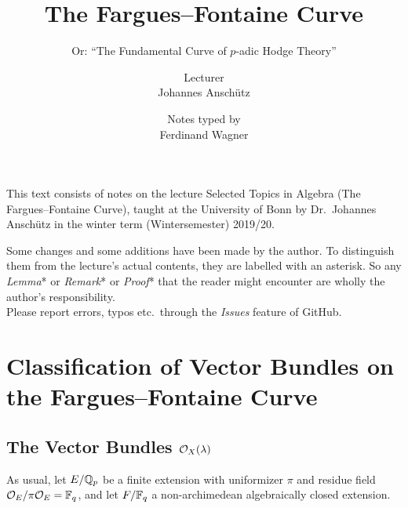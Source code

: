 \documentclass[a4paper, 10pt, oneside, DIV=9, chapterprefix=true, numbers=enddot,bibliography=totoc]{scrbook}
\title{The Fargues--Fontaine Curve}
\subtitle{Or: \enquote{The Fundamental Curve of $p$-adic Hodge Theory}}
\author{{\normalsize Lecturer}\\
	Johannes Anschütz}
\date{{\normalsize Notes typed by}\\
	Ferdinand Wagner}
\begin{document}
\frontmatter
{}
\maketitle
\noindent This text consists of notes on the lecture Selected Topics in Algebra (The Fargues--Fontaine Curve), taught at the University of
Bonn by Dr.\ Johannes Anschütz in the winter term (Wintersemester) 2019/20.

Some changes and some additions have been made by the author. To distinguish them from the lecture's actual contents, they are labelled with an asterisk. So any \emph{Lemma}* or \emph{Remark}* or \emph{Proof}* that the reader might encounter are wholly the author's responsibility.\\[\thmsep]Please report errors, typos etc.\ through the \emph{Issues} feature of GitHub.


\tableofcontents
{}
\setcounter{llecture}{-1}


\mainmatter{}
\renewcommand{\thedummy}{\thesection.\arabic{dummy}}






\chapter{Classification of Vector Bundles on the Fargues--Fontaine Curve}
\section{The Vector Bundles \texorpdfstring{$\mathcal{O}_X(\lambda)$}{O}}
As usual, let $E/\mathbb{Q}_p$ be a finite extension with uniformizer $\pi$ and residue field $\mathcal{O}_E/\pi \mathcal{O}_E=\mathbb{F}_q$, and let $F/\mathbb{F}_q$ a non-archimedean algebraically closed extension. 
\end{document}
